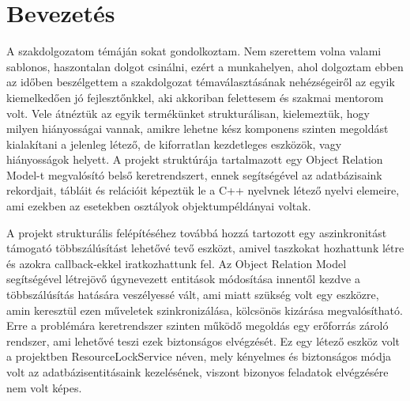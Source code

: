 \chapter {Bevezetés}
\label{ch:intro}

A szakdolgozatom témáján sokat gondolkoztam. Nem szerettem volna valami sablonos, haszontalan dolgot csinálni, ezért a munkahelyen, ahol dolgoztam ebben az időben beszélgettem a szakdolgozat témaválasztásának nehézségeiről az egyik kiemelkedően jó fejlesztőnkkel, aki akkoriban felettesem és szakmai mentorom volt. Vele átnéztük az egyik termékünket strukturálisan, kielemeztük, hogy milyen hiányosságai vannak, amikre lehetne kész komponens szinten megoldást kialakítani a jelenleg létező, de kiforratlan kezdetleges eszközök, vagy hiányosságok helyett. A projekt struktúrája tartalmazott egy Object Relation Model-t megvalósító belső keretrendszert, ennek segítségével az adatbázisaink rekordjait, tábláit és relációit képeztük le a C++\cite{cpp_docs} nyelvnek létező nyelvi elemeire, ami ezekben az esetekben osztályok objektumpéldányai voltak.

A projekt strukturális felépítéséhez továbbá hozzá tartozott egy aszinkronitást támogató többszálúsítást lehetővé tevő eszközt, amivel taszkokat hozhattunk létre és azokra callback-ekkel iratkozhattunk fel. Az Object Relation Model segítségével létrejövő úgynevezett entitások módosítása innentől kezdve a többszálúsítás hatására veszélyessé vált, ami miatt szükség volt egy eszközre, amin keresztül ezen műveletek szinkronizálása, kölcsönös kizárása megvalósítható. Erre a problémára keretrendszer szinten működő megoldás egy erőforrás zároló rendszer, ami lehetővé teszi ezek biztonságos elvégzését. Ez egy létező eszköz volt a projektben ResourceLockService néven, mely kényelmes és biztonságos módja volt az adatbázisentitásaink kezelésének, viszont bizonyos feladatok elvégzésére nem volt képes.

